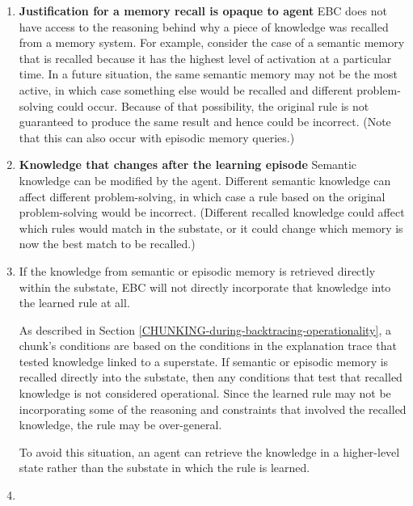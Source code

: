 \begin{enumerate}
	\item \textbf{Justification for a memory recall is opaque to agent} \hfill
	EBC does not have access to the reasoning behind why a piece of knowledge was recalled from a memory system.  For example, consider the case of a semantic memory that is recalled because it has the highest level of activation at a particular time.  In a future situation, the same semantic memory may not be the most active, in which case something else would be recalled and different problem-solving could occur.  Because of that possibility, the original rule is not guaranteed to produce the same result and hence could be incorrect.  (Note that this can also occur with episodic memory queries.)

	\item \textbf{Knowledge that changes after the learning episode} \hfill
	Semantic knowledge can be modified by the agent.  Different semantic knowledge can affect different problem-solving, in which case a rule based on the original problem-solving would be incorrect.  (Different recalled knowledge could affect which rules would match in the substate, or it could change which memory is now the best match to be recalled.)

	\item If the knowledge from semantic or episodic memory is retrieved directly within the substate, EBC will not directly incorporate that knowledge into the learned rule at all.
	
	As described in Section \ref{CHUNKING-during-backtracing-operationality}, a chunk's conditions are based on the conditions in the explanation trace that tested knowledge linked to a superstate.  If semantic or episodic memory is recalled directly into the substate, then any conditions that test that recalled knowledge is not considered operational.  Since the learned rule may not be incorporating some of the reasoning and constraints that involved the recalled knowledge, the rule may be over-general.

	To avoid this situation, an agent can retrieve the knowledge in a higher-level state rather than the substate in which the rule is learned.

	\item %
\end{enumerate}


